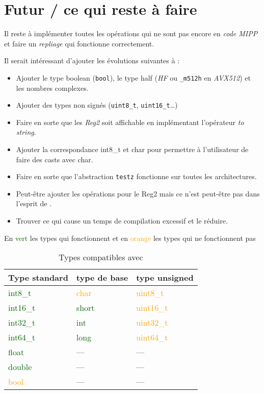 \section{Futur / ce qui reste à faire}

Il reste à implémenter toutes les opérations qui ne sont pas encore en \emph{code MIPP} et
faire un \textit{repliage} qui fonctionne correctement.

Il serait intéressant d'ajouter les évolutions suivantes à \MIPP :

\begin{itemize}
  \item Ajouter le type boolean (\verb|bool|), le type half (\emph{HF} ou
  \verb|_m512h| en \emph{AVX512}) et les nombres complexes.
  \item Ajouter des types non signés (\verb|uint8_t|, \verb|uint16_t|\dots)
  \item Faire en sorte que les \emph{Reg2} soit affichable en implémentant l'opérateur \emph{to string}.
  \item Ajouter la correspondance int8_t et char pour permettre à l'utilisateur de faire
  des casts avec char.
  \item Faire en sorte que l'abstraction \verb|testz| fonctionne sur toutes les architectures.
  \item Peut-être ajouter les opérations pour le Reg2 mais ce n'est peut-être pas dans
  l'esprit de \MIPP.
  \item Trouver ce qui cause un temps de compilation excessif et le réduire.
\end{itemize}

\begin{table}[H]
  \centering
  \caption*{En \textcolor{darkGreen}{vert} les types qui fonctionnent et en \textcolor{orange}{orange}
    les types qui ne fonctionnent pas}
  \begin{tabular}[H]{|l|l|l|}
    \hline
    \textbf{Type standard}          & \textbf{type de base}        & \textbf{type unsigned}        \\
    \hline
    \textcolor{darkGreen}{int8_t}  & \textcolor{orange}{char}     & \textcolor{orange}{uint8_t}  \\
    \hline
    \textcolor{darkGreen}{int16_t} & \textcolor{darkGreen}{short} & \textcolor{orange}{uint16_t} \\
    \hline
    \textcolor{darkGreen}{int32_t} & \textcolor{darkGreen}{int}   & \textcolor{orange}{uint32_t} \\
    \hline
    \textcolor{darkGreen}{int64_t} & \textcolor{darkGreen}{long}  & \textcolor{orange}{uint64_t} \\
    \hline
    \textcolor{darkGreen}{float}    & \----                        & \----                         \\
    \hline
    \textcolor{darkGreen}{double}   & \----                        & \----                         \\
    \hline
    \textcolor{orange}{bool}        & \----                        & \----                         \\
    \hline
  \end{tabular}
  \caption{Types compatibles avec \MIPP}
\end{table}
